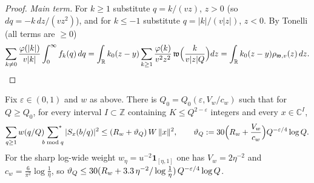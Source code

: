 \begin{proof}
\emph{Main term.} For $k\ge1$ substitute $q=k/(vz)$, $z>0$ (so $dq=-k\,dz/(vz^2)$), and for $k\le-1$ substitute
$q=|k|/(v|z|)$, $z<0$. By Tonelli (all terms are $\ge0$)
\[
 \sum_{k\ne0}\frac{\varphi(|k|)}{v|k|}\int_0^\infty f_k(q)\,dq
 =\int_{\mathbb R}k_0(z-y)\sum_{k\ge1}\frac{\varphi(k)}{v^2z^2}\,\mathfrak w\Big(\frac{k}{v|z|Q}\Big)dz
 =\int_{\mathbb R}k_0(z-y)\rho_{\mathfrak w,v}(z)\,dz. \qedhere
\]
\end{proof}

\begin{lemma}\label{lem:A}
Fix $\varepsilon\in(0,1)$ and $w$ as above. There is $Q_0=Q_0(\varepsilon,V_w/c_w)$ such that for $Q\ge Q_0$, for every
interval $I\subset\mathbb Z$ containing $K\le Q^{2-\varepsilon}$ integers and every $x\in\mathbb C^I$,
\[
 \sum_{q\ge1}w(q/Q)\sideset{}{^*}\sum_{b\bmod q}|S_x(b/q)|^2\le(R_w+\vartheta_Q)\,W\,\|x\|^2,\qquad
 \vartheta_Q:=30\Big(R_w+\frac{V_w}{c_w}\Big)Q^{-\varepsilon/4}\log Q .
\]
For the sharp log-wide weight $w_\eta=u^{-2}\mathbf 1_{[\eta,1]}$ one has $V_w=2\eta^{-2}$ and $c_w=\frac6{\pi^2}\log\frac1\eta$,
so $\vartheta_Q\le30(R_w+3.3\,\eta^{-2}/\log\frac1\eta)\,Q^{-\varepsilon/4}\log Q$.
\end{lemma}

